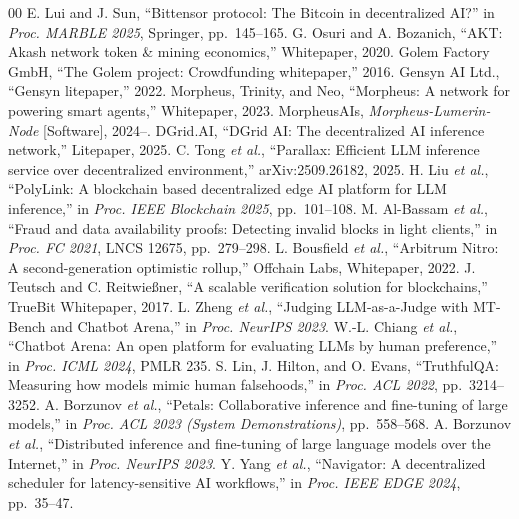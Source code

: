 \documentclass[conference]{IEEEtran}
\begin{document}
\begin{thebibliography}{00}
 E. Lui and J. Sun, ``Bittensor protocol: The Bitcoin in decentralized AI?'' in \emph{Proc. MARBLE 2025}, Springer, pp.~145--165.
 G. Osuri and A. Bozanich, ``AKT: Akash network token \& mining economics,'' Whitepaper, 2020.
 Golem Factory GmbH, ``The Golem project: Crowdfunding whitepaper,'' 2016.
 Gensyn AI Ltd., ``Gensyn litepaper,'' 2022.
 Morpheus, Trinity, and Neo, ``Morpheus: A network for powering smart agents,'' Whitepaper, 2023.
 MorpheusAIs, \emph{Morpheus-Lumerin-Node} [Software], 2024--.
 DGrid.AI, ``DGrid AI: The decentralized AI inference network,'' Litepaper, 2025.
 C. Tong \emph{et al.}, ``Parallax: Efficient LLM inference service over decentralized environment,'' arXiv:2509.26182, 2025.
 H. Liu \emph{et al.}, ``PolyLink: A blockchain based decentralized edge AI platform for LLM inference,'' in \emph{Proc. IEEE Blockchain 2025}, pp.~101--108.
 M. Al-Bassam \emph{et al.}, ``Fraud and data availability proofs: Detecting invalid blocks in light clients,'' in \emph{Proc. FC 2021}, LNCS 12675, pp.~279--298.
 L. Bousfield \emph{et al.}, ``Arbitrum Nitro: A second-generation optimistic rollup,'' Offchain Labs, Whitepaper, 2022.
 J. Teutsch and C. Reitwie{\ss}ner, ``A scalable verification solution for blockchains,'' TrueBit Whitepaper, 2017.
 L. Zheng \emph{et al.}, ``Judging LLM-as-a-Judge with MT-Bench and Chatbot Arena,'' in \emph{Proc. NeurIPS 2023}.
 W.-L. Chiang \emph{et al.}, ``Chatbot Arena: An open platform for evaluating LLMs by human preference,'' in \emph{Proc. ICML 2024}, PMLR 235.
 S. Lin, J. Hilton, and O. Evans, ``TruthfulQA: Measuring how models mimic human falsehoods,'' in \emph{Proc. ACL 2022}, pp.~3214--3252.
 A. Borzunov \emph{et al.}, ``Petals: Collaborative inference and fine-tuning of large models,'' in \emph{Proc. ACL 2023 (System Demonstrations)}, pp.~558--568.
 A. Borzunov \emph{et al.}, ``Distributed inference and fine-tuning of large language models over the Internet,'' in \emph{Proc. NeurIPS 2023}.
 Y. Yang \emph{et al.}, ``Navigator: A decentralized scheduler for latency-sensitive AI workflows,'' in \emph{Proc. IEEE EDGE 2024}, pp.~35--47.
\end{thebibliography}
\end{document}
